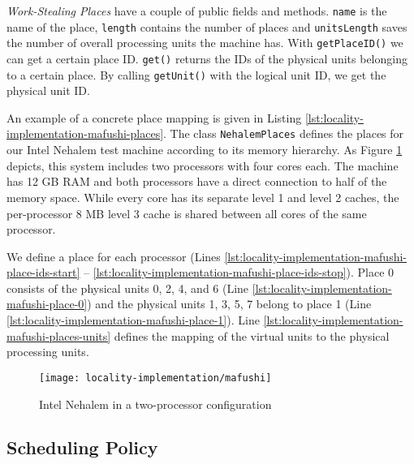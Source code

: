 \emph{Work-Stealing Places} have a couple of public fields and
methods. \lstinline!name! is the name of the place, \lstinline!length!
contains the number of places and \lstinline!unitsLength! saves the
number of overall processing units the machine has. With
\lstinline!getPlaceID()!  we can get a certain place
ID. \lstinline!get()! returns the IDs of the physical units belonging
to a certain place. By calling \lstinline!getUnit()! with the logical
unit ID, we get the physical unit ID.

An example of a concrete place mapping is given in Listing
\ref{lst:locality-implementation-mafushi-places}. The class
\lstinline!NehalemPlaces! defines the places for our Intel Nehalem
test machine according to its memory hierarchy. As Figure
\ref{fig:locality-implemenation-work-stealing-places-mafushi} depicts,
this system includes two processors with four cores each. The machine
has 12 GB RAM and both processors have a direct connection to half of
the memory space. While every core has its separate level 1 and level
2 caches, the per-processor 8 MB level 3 cache is shared between all
cores of the same processor.



We define a place for each processor (Lines
\ref{lst:locality-implementation-mafushi-place-ids-start} --
\ref{lst:locality-implementation-mafushi-place-ids-stop}). Place 0
consists of the physical units 0, 2, 4, and 6 (Line
\ref{lst:locality-implementation-mafushi-place-0}) and the physical
units 1, 3, 5, 7 belong to place 1 (Line
\ref{lst:locality-implementation-mafushi-place-1}). Line
\ref{lst:locality-implementation-mafushi-places-units} defines the
mapping of the virtual units to the physical processing units.

\begin{figure}[!htb]
  \centering
  \texttt{[image: locality-implementation/mafushi]}
  \caption{Intel Nehalem in a two-processor configuration}
  \label{fig:locality-implemenation-work-stealing-places-mafushi}
\end{figure}

\subsection{Scheduling Policy}
\label{sec:locality-implementation-work-stealing-places-scheduling}

